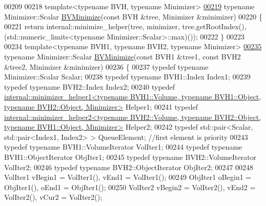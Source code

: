 \begin{DoxyCode}
00209 
00218 \textcolor{keyword}{template}<\textcolor{keyword}{typename} BVH, \textcolor{keyword}{typename} Minimizer>
\hyperlink{namespace_eigen_adcbe73ac1482eacab0e18ee32c25508e}{00219} \textcolor{keyword}{typename} Minimizer::Scalar \hyperlink{namespace_eigen_adcbe73ac1482eacab0e18ee32c25508e}{BVMinimize}(\textcolor{keyword}{const} BVH &tree, Minimizer &minimizer)
00220 \{
00221   \textcolor{keywordflow}{return} internal::minimize\_helper(tree, minimizer, tree.getRootIndex(), (std::numeric\_limits<typename
       Minimizer::Scalar>::max)());
00222 \}
00223 
00234 \textcolor{keyword}{template}<\textcolor{keyword}{typename} BVH1, \textcolor{keyword}{typename} BVH2, \textcolor{keyword}{typename} Minimizer>
\hyperlink{namespace_eigen_a915f6adc8b195c94a83c35de6a842556}{00235} \textcolor{keyword}{typename} Minimizer::Scalar \hyperlink{namespace_eigen_adcbe73ac1482eacab0e18ee32c25508e}{BVMinimize}(\textcolor{keyword}{const} BVH1 &tree1, \textcolor{keyword}{const} BVH2 &tree2, Minimizer &minimizer)
00236 \{
00237   \textcolor{keyword}{typedef} \textcolor{keyword}{typename} Minimizer::Scalar Scalar;
00238   \textcolor{keyword}{typedef} \textcolor{keyword}{typename} BVH1::Index Index1;
00239   \textcolor{keyword}{typedef} \textcolor{keyword}{typename} BVH2::Index Index2;
00240   \textcolor{keyword}{typedef} 
      \hyperlink{struct_eigen_1_1internal_1_1minimizer__helper1}{internal::minimizer\_helper1<typename BVH1::Volume, typename BVH1::Object, typename BVH2::Object, Minimizer>}
       Helper1;
00241   \textcolor{keyword}{typedef} 
      \hyperlink{struct_eigen_1_1internal_1_1minimizer__helper2}{internal::minimizer\_helper2<typename BVH2::Volume, typename BVH2::Object, typename BVH1::Object, Minimizer>}
       Helper2;
00242   \textcolor{keyword}{typedef} std::pair<Scalar, std::pair<Index1, Index2> > QueueElement; \textcolor{comment}{//first element is priority}
00243   \textcolor{keyword}{typedef} \textcolor{keyword}{typename} BVH1::VolumeIterator VolIter1;
00244   \textcolor{keyword}{typedef} \textcolor{keyword}{typename} BVH1::ObjectIterator ObjIter1;
00245   \textcolor{keyword}{typedef} \textcolor{keyword}{typename} BVH2::VolumeIterator VolIter2;
00246   \textcolor{keyword}{typedef} \textcolor{keyword}{typename} BVH2::ObjectIterator ObjIter2;
00247 
00248   VolIter1 vBegin1 = VolIter1(), vEnd1 = VolIter1();
00249   ObjIter1 oBegin1 = ObjIter1(), oEnd1 = ObjIter1();
00250   VolIter2 vBegin2 = VolIter2(), vEnd2 = VolIter2(), vCur2 = VolIter2();

\end{DoxyCode}
